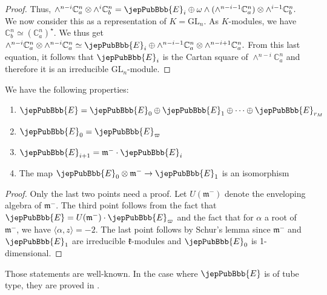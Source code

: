 \begin{proof}
Thus, $\wedge^{n-i}\mathbb C_a^n\otimes\wedge^i\mathbb C_b^n=\jepPubBbb{E}_i\oplus\omega\wedge(\wedge^{n-i-1}\mathbb C_a^n)\otimes\wedge^{i-1}\mathbb C_b^n.$ We now consider this as a representation of $K=\mathrm{GL}_n$. As $K$-modules, we have $\mathbb C_b^n\simeq(\mathbb C_a^n)^\star$. We thus get $\wedge^{n-i}\mathbb C_a^n\otimes\wedge^{n-i}\mathbb C_a^n\simeq\jepPubBbb{E}_i\oplus\wedge^{n-i-1}\mathbb C_a^n\otimes\wedge^{n-i+1}\mathbb C_a^n.$ From this last equation, it follows that $\jepPubBbb{E}_i$ is the Cartan square of $\wedge^{n-i}\mathbb C_a^n$ and therefore it is an irreducible $\mathrm{GL}_n$-module.
\end{proof}
\begin{proposition}
We have the following properties:
\begin{enumerate}[label=(\alph*)]
\item $\jepPubBbb{E}=\jepPubBbb{E}_0\oplus\jepPubBbb{E}_1\oplus\cdots\oplus\jepPubBbb{E}_{r_M}$
\item $\jepPubBbb{E}_0=\jepPubBbb{E}_\varpi$
\item $\jepPubBbb{E}_{i+1}=\mathfrak m^-\cdot\jepPubBbb{E}_i$
\item The map $\jepPubBbb{E}_0\otimes\mathfrak m^-\to\jepPubBbb{E}_1$ is an isomorphism
\end{enumerate}
\end{proposition}
\begin{proof}
Only the last two points need a proof. Let $U(\mathfrak m^-)$ denote the enveloping algebra of $\mathfrak m^-$. The third point follows from the fact that $\jepPubBbb{E}=U(\mathfrak m^-)\cdot\jepPubBbb{E}_\varpi$ and the fact that for $\alpha$ a root of $\mathfrak m^-$, we have $\langle\alpha,z\rangle=-2$. The last point follows by Schur’s lemma since $\mathfrak m^-$ and $\jepPubBbb{E}_1$ are irreducible $\mathfrak k$-modules and $\jepPubBbb{E}_0$ is 1-dimensional.
\end{proof}
\begin{remark}
Those statements are well-known. In the case where $\jepPubBbb{E}$ is of tube type, they are proved in \cite[Prop.~5.2]{jep93Gro94}.
\end{remark}

